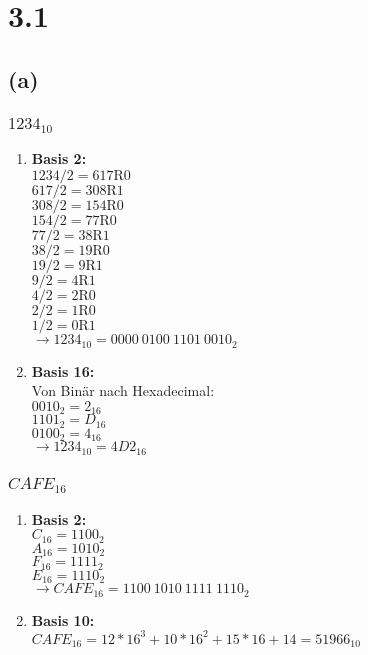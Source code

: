 \section*{3.1}
\subsection*{(a)}
\subsubsection*{$1234_{10}$}
\begin{enumerate}
	\item \textbf{Basis 2:}\\
	$1234 / 2 = 617 \text{R} 0$\\
	$617 / 2 = 308 \text{R} 1$\\
	$308 / 2 = 154 \text{R} 0$\\ 
	$154 / 2 = 77 \text{R} 0$\\
	$77 / 2 = 38 \text{R} 1$\\
	$38 / 2 = 19 \text{R} 0$\\
	$19 / 2 = 9 \text{R} 1$\\
	$9 / 2 = 4 \text{R} 1$\\
	$4 / 2 = 2 \text{R} 0$\\
	$2 / 2 = 1 \text{R} 0$\\
	$1 / 2 = 0 \text{R} 1$\\
	$\rightarrow 1234_{10} = 0000\ 0100\ 1101\ 0010_2$
	\item \textbf{Basis 16:}\\
	Von Binär nach Hexadecimal:\\
	$0010_2 = 2_{16}$\\
	$1101_2 = D_{16}$\\
	$0100_2 = 4_{16}$\\
	$\rightarrow 1234_{10} = 4D2_{16}$
\end{enumerate}
\subsubsection*{$CAFE_{16}$}
\begin{enumerate}
\item \textbf{Basis 2:}\\
$C_{16} = 1100_2$\\
$A_{16} = 1010_2$\\
$F_{16} = 1111_2$\\
$E_{16} = 1110_2$\\
$\rightarrow CAFE_{16} = 1100\ 1010\ 1111\ 1110_2$
\item \textbf{Basis 10:}\\
$CAFE_{16} = 12 * 16^3 + 10 * 16^2 + 15 * 16 + 14 = 51966_{10}$
\end{enumerate}

